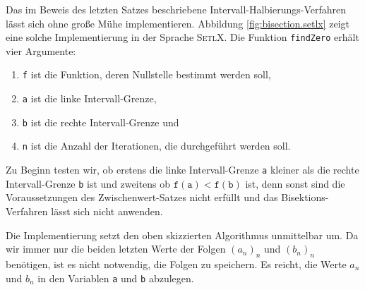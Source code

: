 \noindent
Das im Beweis des letzten Satzes beschriebene Intervall-Halbierungs-Verfahren l\"asst sich
ohne gro{\ss}e M\"uhe  implementieren.  Abbildung \ref{fig:bisection.setlx}
zeigt eine solche Implementierung in der Sprache \textsc{SetlX}.  Die Funktion \texttt{findZero}
erh\"alt vier Argumente:
\begin{enumerate}
\item \texttt{f} ist die Funktion, deren Nullstelle bestimmt werden soll,
\item \texttt{a} ist die linke Intervall-Grenze, 
\item \texttt{b} ist die rechte Intervall-Grenze und
\item \texttt{n} ist die Anzahl der Iterationen, die durchgef\"uhrt werden soll.
\end{enumerate}
Zu Beginn testen wir, ob erstens die linke Intervall-Grenze \texttt{a} kleiner als die rechte
Intervall-Grenze \texttt{b} ist und zweitens ob $\mathtt{f(a)} < \mathtt{f(b)}$ ist, denn sonst sind
die Voraussetzungen des Zwischenwert-Satzes nicht erf\"ullt und das Bisektions-Verfahren l\"asst sich nicht anwenden.

Die Implementierung setzt den oben skizzierten Algorithmus unmittelbar um.  Da wir immer nur die
beiden letzten Werte der Folgen $(a_n)_n$ und $(b_n)_n$ ben\"otigen, ist es nicht notwendig, die
Folgen zu speichern.  Es reicht, die Werte $a_n$ und $b_n$ in den Variablen \texttt{a} und
\texttt{b} abzulegen. 

